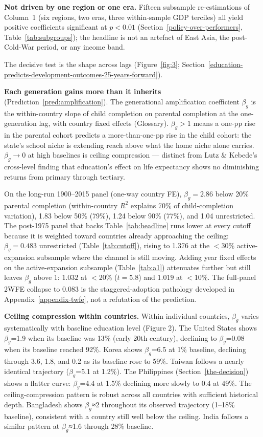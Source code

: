 \documentclass[12pt,letterpaper]{article}
\begin{document}
\textbf{Not driven by one region or one era.} Fifteen subsample re-estimations of Column~1 (six regions, two eras, three within-sample GDP terciles) all yield positive coefficients significant at $p<0.01$ (Section~\ref{policy-over-performers}, Table~\ref{tab:subgroups}); the headline is not an artefact of East Asia, the post-Cold-War period, or any income band.

The decisive test is the shape across lags (Figure~\ref{fig:3}; Section~\ref{education-predicts-development-outcomes-25-years-forward}).

\textbf{Each generation gains more than it inherits}
(Prediction~\ref{pred:amplification}). The generational amplification
coefficient $\beta_g$ is the within-country slope of child completion
on parental completion at the one-generation lag, with country fixed
effects (Glossary). $\beta_g > 1$ means a one-pp rise in the parental
cohort predicts a more-than-one-pp rise in the child cohort: the
state's school niche is extending reach above what the home niche
alone carries. $\beta_g \to 0$ at high baselines is ceiling compression
--- distinct from Lutz \& Kebede's cross-level finding that education's
effect on life expectancy shows no diminishing returns from primary
through tertiary.

On the long-run 1900--2015 panel (one-way country FE), $\beta_g = 2.86$
below 20\% parental completion (within-country $R^2$ explains 70\%
of child-completion variation), 1.83 below 50\% (79\%), 1.24 below
90\% (77\%), and 1.04 unrestricted.
The post-1975 panel that backs Table~\ref{tab:headline} runs lower at every
cutoff because it is weighted toward countries already approaching
the ceiling: $\beta_g = 0.483$ unrestricted (Table~\ref{tab:cutoff}),
rising to 1.376 at the $<$30\% active-expansion subsample where the
channel is still moving. Adding year fixed effects on the
active-expansion subsample (Table~\ref{tab:a1}) attenuates further
but still leaves $\beta_g$ above 1: $1.032$ at $<$20\% ($t = 5.8$)
and $1.019$ at $<$10\%. The full-panel 2WFE collapse to 0.083 is the
staggered-adoption pathology developed in Appendix~\ref{appendix-twfe},
not a refutation of the prediction.

\textbf{Ceiling compression within countries.} Within individual countries,
$\beta_g$ varies systematically with baseline education level (Figure
2). The United States shows $\beta_g$=1.9 when its baseline was 13\%
(early 20th century), declining to $\beta_g$=0.08 when its baseline
reached 92\%. Korea shows $\beta_g$=6.5 at 1\% baseline, declining
through 3.6, 1.8, and 0.2 as its baseline rose to 59\%. Taiwan follows
a nearly identical trajectory ($\beta_g$=5.1 at 1.2\%). The Philippines
(Section~\ref{the-decision}) shows a flatter curve: $\beta_g$=4.4 at 1.5\% declining
more slowly to 0.4 at 49\%. The ceiling-compression pattern is robust across all
countries with sufficient historical depth. Bangladesh shows
$\beta_g$≈2 throughout its observed trajectory (1--18\% baseline),
consistent with a country still well below the ceiling. India
follows a similar pattern at $\beta_g$≈1.6 through 28\% baseline.
\end{document}
